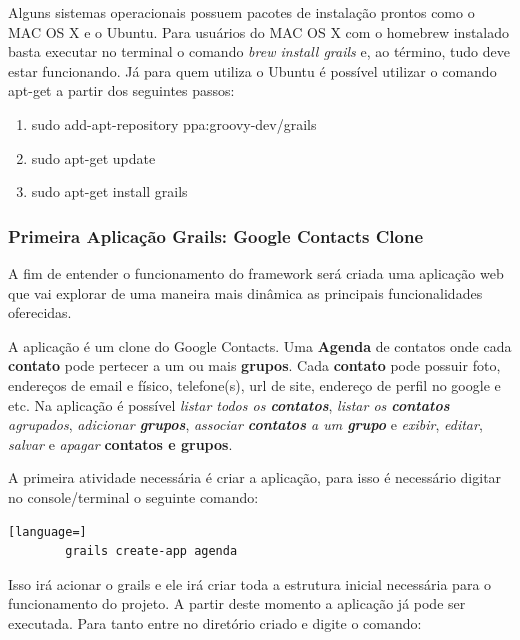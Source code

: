 \documentclass[12pt]{article}
\begin{document}
    Alguns sistemas operacionais possuem pacotes de instalação prontos como o MAC
    OS X e o Ubuntu. Para usuários do MAC OS X com o homebrew instalado basta executar
    no terminal o comando \emph{brew install grails} e, ao término, tudo deve 
    estar funcionando. Já para quem utiliza o Ubuntu é possível utilizar o comando 
    apt-get a partir dos seguintes passos:
    
    \begin{enumerate}
        \item sudo add-apt-repository ppa:groovy-dev/grails
        \item sudo apt-get update
        \item sudo apt-get install grails
    \end{enumerate}

\subsubsection{Primeira Aplicação Grails: Google Contacts Clone}

    A fim de entender o funcionamento do framework será criada uma aplicação web
    que vai explorar de uma maneira mais dinâmica as principais funcionalidades
    oferecidas.

    A aplicação é um clone do Google Contacts. Uma \textbf{Agenda} de contatos onde cada 
    \textbf{contato} pode pertecer a um ou mais \textbf{grupos}. Cada \textbf{contato}
    pode possuir foto, endereços de email e físico, telefone(s), url de site, endereço 
    de perfil no google e etc. Na aplicação é possível \emph{listar todos os 
    \textbf{contatos}}, \emph{listar os \textbf{contatos} agrupados}, 
    \emph{adicionar \textbf{grupos}}, \emph{associar \textbf{contatos} a um \textbf{grupo}}
    e \emph{exibir}, \emph{editar}, \emph{salvar} e \emph{apagar} \textbf{contatos e grupos}.
    
    A primeira atividade necessária é criar a aplicação, para isso é necessário
    digitar no console/terminal o seguinte comando:
    
    \begin{lstlisting}[language=]
        grails create-app agenda
    \end{lstlisting}
    
    Isso irá acionar o grails e ele irá criar toda a estrutura inicial necessária para
    o funcionamento do projeto. A partir deste momento a aplicação já pode ser 
    executada. Para tanto entre no diretório criado e digite o comando:
    
\end{document}
